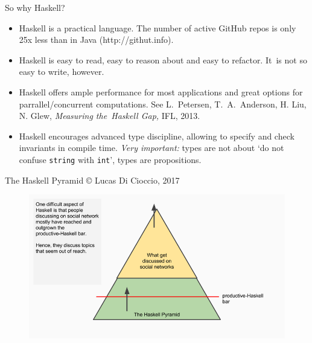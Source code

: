 \documentclass[handout]{beamer}
\begin{document}
\begin{frame}[fragile]{So why Haskell?}

\begin{itemize}

\item Haskell is a practical language. The number of active GitHub repos is only 25x less than in Java (http://githut.info).

\item Haskell is easy to read, easy to reason about and easy to refactor.
  It~is not so easy to write, however.

\item Haskell offers ample performance for most applications and great options for parrallel/concurrent computations.
  See L.~Petersen, T.~A.~Anderson, H. Liu, N. Glew, {\em Measuring the~Haskell Gap,} IFL, 2013.

\item Haskell encourages advanced type discipline, allowing to specify and check invariants in compile time.
  {\em Very important:} types are not about `do not confuse {\tt string} with {\tt int}', types are propositions.

\end{itemize}

\end{frame}

\begin{frame}[fragile]{The Haskell Pyramid © Lucas Di Cioccio, 2017}

\begin{figure}[H]
\centering
\includegraphics[width=1.1\textwidth]{pyramid.png}
\end{figure}

\end{frame}
\end{document}
